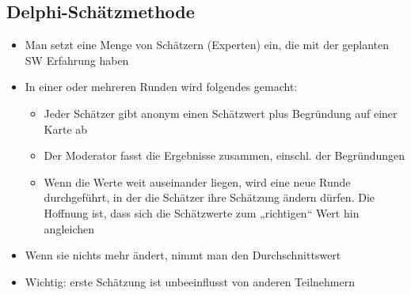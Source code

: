 \subsection{Delphi-Schätzmethode}
\begin{itemize}
    \item Man setzt eine Menge von Schätzern (Experten) ein, die mit der geplanten SW Erfahrung haben
    \item In einer oder mehreren Runden wird folgendes gemacht:
    \begin{itemize}
        \item Jeder Schätzer gibt anonym einen Schätzwert plus Begründung auf einer Karte ab
        \item Der Moderator fasst die Ergebnisse zusammen, einschl. der Begründungen
        \item Wenn die Werte weit auseinander liegen, wird eine neue Runde durchgeführt, in der die Schätzer ihre Schätzung ändern dürfen. Die Hoffnung ist, dass sich die Schätzwerte zum „richtigen“ Wert hin angleichen
    \end{itemize}
    \item Wenn sie nichts mehr ändert, nimmt man den Durchschnittswert
    \item Wichtig: erste Schätzung ist unbeeinflusst von anderen Teilnehmern
\end{itemize}